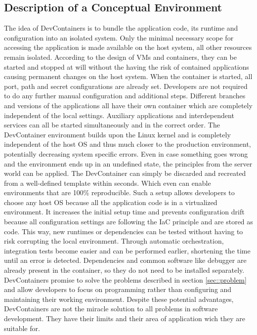     \subsection{Description of a Conceptual Environment}
    The idea of DevContainers is to bundle the application code, its runtime and configuration into an isolated system. Only the minimal necessary scope for accessing the application is made available on the host system, all other resources remain isolated. According to the design of \ac{VM}s and containers, they can be started and stopped at will without the having the risk of contained applications causing permanent changes on the host system. When the container is started, all port, path and secret configurations are already set. Developers are not required to do any further manual configuration and additional steps. Different branches and versions of the applications all have their own container which are completely independent of the local settings. Auxiliary applications and interdependent services can all be started simultaneously and in the correct order. The DevContainer environment builds upon the Linux kernel and is completely independent of the host \ac{OS} and thus much closer to the production environment, potentially decreasing system specific errors. Even in case something goes wrong and the environment ends up in an undefined state, the principles from the server world can be applied. The DevContainer can simply be discarded and recreated from a well-defined template within seconds. Which even can enable environments that are 100\% reproducible.\newline
    Such a setup allows developers to choose any host \acl{OS} because all the application code is in a virtualized environment. It increases the initial setup time and prevents configuration drift because all configuration settings are following the \ac{IaC} principle and are stored as code. This way, new runtimes or dependencies can be tested without having to risk corrupting the local environment. Through automatic orchestration, integration tests become easier and can be performed earlier, shortening the time until an error is detected. Dependencies and common software like debugger are already present in the container, so they do not need to be installed separately. DevContainers promise to solve the problems described in section \ref{sec::problem} and allow developers to focus on programming rather than configuring and maintaining their working environment.\newline
    Despite these potential advantages, DevContainers are not the miracle solution to all problems in software development. They have their limits and their area of application wich they are suitable for.

